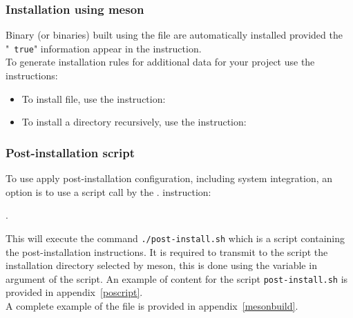\newpage
\subsubsection*{Installation using meson}

Binary (or binaries) built using the file  are automatically installed provided the "~\texttt{true}" information appear in the  instruction. \\[0.25cm]
To generate installation rules for additional data for your project use the  instructions:
\begin{itemize}
\item To install file, use the  instruction:
\begin{scripti}
\end{scripti}
\item To install a directory recursively, use the  instruction:
\begin{scripti}
\end{scripti}
\end{itemize}

\subsubsection*{Post-installation script}

To use apply post-installation configuration, including system integration, an option is to use a
script call by the . instruction:
\begin{script}
.
\end{script}
This will execute the command \texttt{./post-install.sh} which is a script containing the post-installation instructions. 
It is required to transmit to the script the installation directory selected by meson, this is done using the variable  in argument of the script. 
An example of content for the script \texttt{post-install.sh} is provided in appendix~\ref{poscript}. \\[0.25cm]
A complete example of the file  is provided in appendix~\ref{mesonbuild}.

